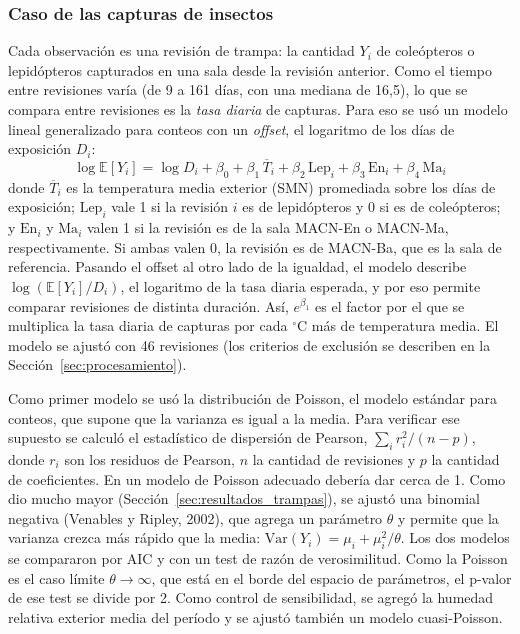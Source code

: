 \documentclass[11pt,a4paper]{article}
\begin{document}
\subsubsection{Caso de las capturas de insectos}
Cada observación es una revisión de trampa: la cantidad $Y_i$ de coleópteros o lepidópteros capturados en una sala desde la revisión anterior. Como el tiempo entre revisiones varía (de 9 a 161 días, con una mediana de 16{,}5), lo que se compara entre revisiones es la \textit{tasa diaria} de capturas. Para eso se usó un modelo lineal generalizado para conteos con un \textit{offset}, el logaritmo de los días de exposición $D_i$:
\begin{equation}
\log \mathbb{E}[Y_i] = \log D_i + \beta_0 + \beta_1\, \overline{T}_i + \beta_2\, \text{Lep}_i + \beta_3\, \text{En}_i + \beta_4\, \text{Ma}_i
\label{eq:modelo_poisson}
\end{equation}
donde $\overline{T}_i$ es la temperatura media exterior (SMN) promediada sobre los días de exposición; $\text{Lep}_i$ vale 1 si la revisión $i$ es de lepidópteros y 0 si es de coleópteros; y $\text{En}_i$ y $\text{Ma}_i$ valen 1 si la revisión es de la sala MACN-En o MACN-Ma, respectivamente. Si ambas valen 0, la revisión es de MACN-Ba, que es la sala de referencia. Pasando el offset al otro lado de la igualdad, el modelo describe $\log(\mathbb{E}[Y_i]/D_i)$, el logaritmo de la tasa diaria esperada, y por eso permite comparar revisiones de distinta duración. Así, $e^{\beta_1}$ es el factor por el que se multiplica la tasa diaria de capturas por cada $^\circ$C más de temperatura media. El modelo se ajustó con 46 revisiones (los criterios de exclusión se describen en la Sección~\ref{sec:procesamiento}).

Como primer modelo se usó la distribución de Poisson, el modelo estándar para conteos, que supone que la varianza es igual a la media. Para verificar ese supuesto se calculó el estadístico de dispersión de Pearson, $\sum_i r_i^2/(n-p)$, donde $r_i$ son los residuos de Pearson, $n$ la cantidad de revisiones y $p$ la cantidad de coeficientes. En un modelo de Poisson adecuado debería dar cerca de 1. Como dio mucho mayor (Sección~\ref{sec:resultados_trampas}), se ajustó una binomial negativa (Venables y Ripley, 2002), que agrega un parámetro $\theta$ y permite que la varianza crezca más rápido que la media: $\mathrm{Var}(Y_i) = \mu_i + \mu_i^2/\theta$. Los dos modelos se compararon por AIC y con un test de razón de verosimilitud. Como la Poisson es el caso límite $\theta \to \infty$, que está en el borde del espacio de parámetros, el p-valor de ese test se divide por 2. Como control de sensibilidad, se agregó la humedad relativa exterior media del período y se ajustó también un modelo cuasi-Poisson.
\end{document}
